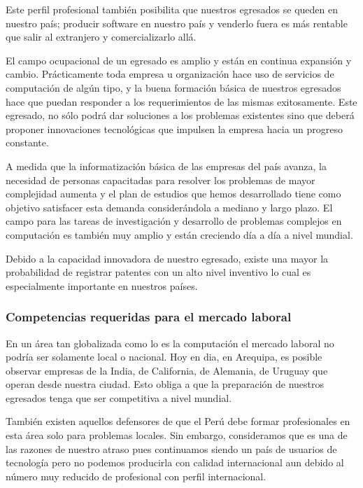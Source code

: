 Este perfil profesional también posibilita que nuestros egresados se queden en nuestro país; 
producir software en nuestro país y venderlo fuera es más rentable que salir al extranjero y comercializarlo allá.

El campo ocupacional de un egresado es amplio y están en continua expansión y cambio. 
Prácticamente toda empresa u organización hace uso de servicios de computación de algún tipo, y la buena 
formación básica de nuestros egresados hace que puedan responder a los requerimientos de las mismas exitosamente. 
Este egresado, no sólo podrá dar soluciones a los problemas existentes sino que deberá proponer innovaciones 
tecnológicas que impulsen la empresa hacia un progreso constante.

A medida que la informatización básica de las empresas del país avanza, la necesidad de personas capacitadas 
para resolver los problemas de mayor complejidad aumenta y el plan de estudios que hemos desarrollado tiene 
como objetivo satisfacer esta demanda considerándola a mediano y largo plazo. El campo para las tareas de 
investigación y desarrollo de problemas complejos en computación es también muy amplio y están creciendo día a día a nivel mundial.

Debido a la capacidad innovadora de nuestro egresado, existe una mayor la probabilidad de registrar 
patentes con un alto nivel inventivo lo cual es especialmente importante en nuestros países.

\subsubsection{Competencias requeridas para el mercado laboral}
En un área tan globalizada como lo es la computación el mercado laboral no podría ser solamente local o nacional.
Hoy en dia, en Arequipa, es posible observar empresas de la India, de California, de Alemania, de Uruguay que operan desde nuestra ciudad.
Esto obliga a que la preparación de nuestros egresados tenga que ser competitiva a nivel mundial.

También existen aquellos defensores de que el Perú debe formar profesionales en esta área solo para problemas locales.
Sin embargo, consideramos que es una de las razones de nuestro atraso pues continuamos siendo un país de usuarios de 
tecnología pero no podemos producirla con calidad internacional aun debido al número muy reducido de profesional con perfil internacional. 

